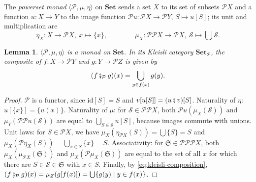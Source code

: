 \documentclass[11pt,a4paper]{article}
\theoremstyle{plain}
\newtheorem{lemma}[theorem]{Lemma}
\theoremstyle{definition}
\theoremstyle{remark}
\newcommand{\Cat}[1]{\mathbf{#1}}
\newcommand{\Set}{\Cat{Set}}
\newcommand{\pow}{\mathcal{P}}
\newcommand{\SetP}{\Set_{\pow}}
\newcommand{\then}{\mathbin{\fatsemi}}
\newcommand{\thenP}{\mathbin{\fatsemi_{\pow}}}
\newcommand{\tup}[1]{\langle #1 \rangle}
\newcommand{\id}{\mathrm{id}}
\begin{document}
The \emph{powerset monad} $\tup{\pow, \mu, \eta}$ on $\Set$ sends a set $X$ to its set of subsets $\pow X$ and a function $u \colon X \to Y$ to the image function $\pow u \colon \pow X \to \pow Y$, $S \mapsto u[S]$; its unit and multiplication are
\begin{equation*}
    \eta_X \colon X \to \pow X,\ x \mapsto \{x\},
    \qquad \qquad
    \mu_X \colon \pow \pow X \to \pow X,\ \mathcal{S} \mapsto \textstyle\bigcup \mathcal{S}.
\end{equation*}

\begin{lemma}
    \label{lem:powerset-monad}
    $\tup{\pow, \mu, \eta}$ is a monad on $\Set$.
    In its Kleisli category $\SetP$, the composite of $f \colon X \to \pow Y$ and $g \colon Y \to \pow Z$ is given by
    \begin{equation}
        \label{eq:kleisli-powerset}
        (f \thenP g)(x) = \bigcup_{y \in f(x)} g(y).
    \end{equation}
\end{lemma}
\begin{proof}
    $\pow$ is a functor, since $\id[S] = S$ and $v[u[S]] = (u \then v)[S]$.
    Naturality of $\eta$: $u[\{x\}] = \{u(x)\}$.
    Naturality of $\mu$: for $\mathcal{S} \in \pow\pow X$, both $\pow u (\mu_X(\mathcal{S}))$ and $\mu_Y(\pow\pow u(\mathcal{S}))$ are equal to $\bigcup_{S \in \mathcal{S}} u[S]$, because images commute with unions.
    Unit laws: for $S \in \pow X$, we have $\mu_X(\eta_{\pow X}(S)) = \bigcup \{S\} = S$ and $\mu_X(\pow \eta_X(S)) = \bigcup_{x \in S} \{x\} = S$.
    Associativity: for $\mathfrak{S} \in \pow\pow\pow X$, both $\mu_X(\mu_{\pow X}(\mathfrak{S}))$ and $\mu_X(\pow\mu_X(\mathfrak{S}))$ are equal to the set of all $x$ for which there are $S \in \mathcal{S} \in \mathfrak{S}$ with $x \in S$.
    Finally, by \cref{eq:kleisli-composition}, $(f \thenP g)(x) = \mu_Z(g[f(x)]) = \bigcup \{ g(y) \mid y \in f(x) \}$.
\end{proof}
\end{document}

